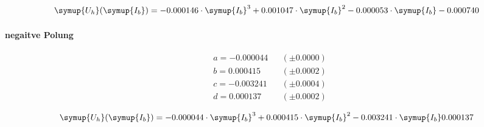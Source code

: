 \begin{equation}
   \symup{U_h}(\symup{I_b})=-0.000146 \cdot \symup{I_b}^3 + 0.001047\cdot\symup{I_b}^2 -0.000053\cdot\symup{I_b} -0.000740
\end{equation}

\paragraph{negaitve Polung}

\begin{align*}
&a = -0.000044 &&(\pm 0.0000) \\
&b = 0.000415 &&(\pm 0.0002) \\
&c = -0.003241 &&(\pm 0.0004) \\
&d = 0.000137 &&(\pm 0.0002) 
\end{align*}

\begin{equation}
   \symup{U_h}(\symup{I_b})=-0.000044 \cdot \symup{I_b}^3 + 0.000415\cdot\symup{I_b}^2 -0.003241\cdot\symup{I_b} 0.000137
\end{equation}



%
